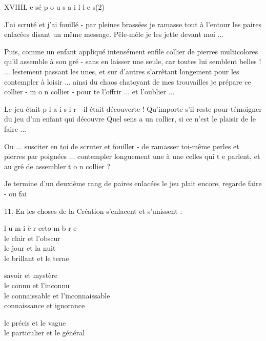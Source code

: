 XVIII\qquad L e s\quad é p o u s a i l l e s\qquad (2)

J'ai scruté et j'ai fouillé - par pleines brassées je ramasse tout à l'entour les paires enlacées disant un même message. Pêle-mêle je les jette devant moi ...

Puis, comme un enfant appliqué intensément enfile collier de pierres multicolores qu'il assemble à son gré - sans en laisser une seule, car toutes lui semblent belles ! ... lestement passant les unes, et sur d'autres s'arrêtant longement pour les contempler à loisir ... ainsi du chaos chatoyant de mes trouvailles je prépare ce collier - m o n collier - pour te l'offrir ... et  l'oublier ...

Le jeu était p l a i s i r - il était découverte ! Qu'importe s'il reste  pour témoigner du jeu  d'un enfant qui découvre \unsure{!} Quel sens a un collier, si ce n'est le plaisir de le faire ...

Ou ... susciter en \uline{toi}  de scruter et fouiller - de ramasser toi-même perles et pierres par poignées ... contempler longuement une à une celles qui t e parlent, et au gré de    assembler t o n collier ?



Je termine d'un deuxième rang de paires enlacées   le jeu  plait encore,  regarde faire - ou  fai

11. En les choses de la Création s'enlacent et s'unissent :

\begin{flushleft}
l u m i è r e\quad et\quad o m b r e\\
le clair et l'obscur\\
le jour et la nuit\\
le brillant et le terne

savoir et mystère\\
le connu et l'inconnu\\
le connaissable et l'inconnaissable\\
connaissance et ignorance

le précis et le vague\\
le particulier et le général
\end{flushleft}


